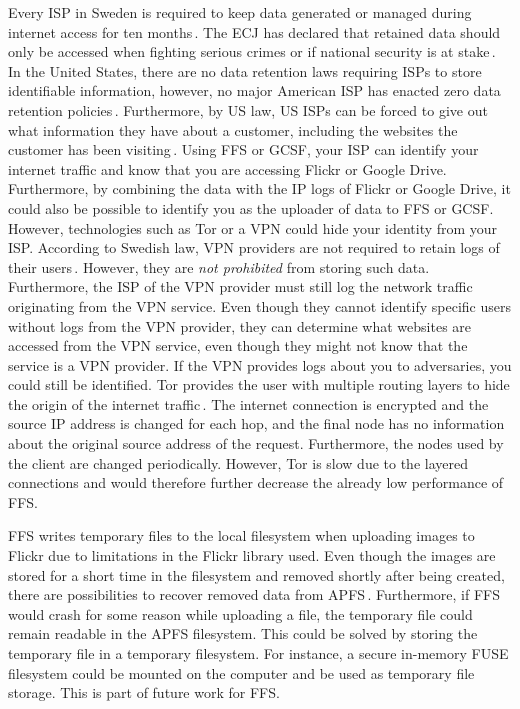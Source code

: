 Every \gls{ISP} in Sweden is required to keep data generated or managed during internet access for ten months\,\cite{post-ochtelestyrelsenFragorOchSvar2019}. The \gls{ECJ} has declared that retained data should only be accessed when fighting serious crimes or if national security is at stake\,\cite{EuropeanCourtJustice2017}. In the United States, there are no data retention laws requiring \glspl{ISP} to store identifiable information, however, no major American \gls{ISP} has enacted zero data retention policies\,\cite{lawofficesofsalaratrizadehUnitedStatesData2021}. Furthermore, by US law, US \glspl{ISP} can be forced to give out what information they have about a customer, including the websites the customer has been visiting\,\cite{instituteDataRetentionLaws}. Using \gls{FFS} or \gls{GCSF}, your \gls{ISP} can identify your internet traffic and know that you are accessing Flickr or Google Drive. Furthermore, by combining the data with the IP logs of Flickr or Google Drive, it could also be possible to identify you as the uploader of data to \gls{FFS} or \gls{GCSF}. However, technologies such as Tor or a \gls{VPN} could hide your identity from your \gls{ISP}. According to Swedish law, \gls{VPN} providers are not required to retain logs of their users\,\cite{walshInternetCensorshipSweden2020}. However, they are \textit{not prohibited} from storing such data. Furthermore, the \gls{ISP} of the \gls{VPN} provider must still log the network traffic originating from the \gls{VPN} service. Even though they cannot identify specific users without logs from the \gls{VPN} provider, they can determine what websites are accessed from the \gls{VPN} service, even though they might not know that the service is a \gls{VPN} provider. If the \gls{VPN} provides logs about you to adversaries, you could still be identified. Tor provides the user with multiple routing layers to hide the origin of the internet traffic\,\cite{ramadhaniAnonymityCommunicationVPN2018}. The internet connection is encrypted and the source IP address is changed for each hop, and the final node has no information about the original source address of the request. Furthermore, the nodes used by the client are changed periodically. However, Tor is slow due to the layered connections and would therefore further decrease the already low performance of \gls{FFS}. 

\gls{FFS} writes temporary files to the local filesystem when uploading images to Flickr due to limitations in the Flickr library used. Even though the images are stored for a short time in the filesystem and removed shortly after being created, there are possibilities to recover removed data from \gls{APFS}\,\cite{llcsysdevlaboratoriesHowRecoverData2022,cedricAPFSDataRecovery2022,santosHowRecoverData2021}. Furthermore, if \gls{FFS} would crash for some reason while uploading a file, the temporary file could remain readable in the \gls{APFS} filesystem. This could be solved by storing the temporary file in a temporary filesystem. For instance, a secure in-memory \gls{FUSE} filesystem could be mounted on the computer and be used as temporary file storage. This is part of future work for \gls{FFS}.

